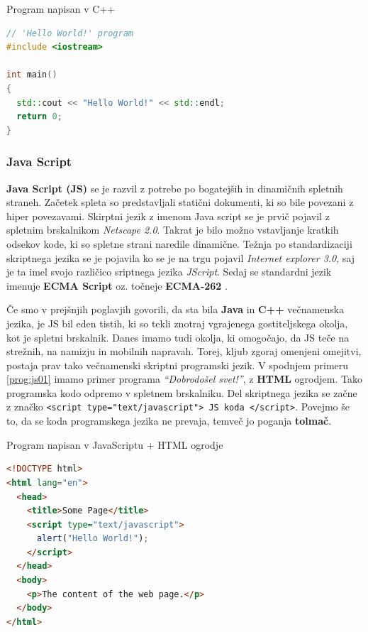 \begin{examplebox}[label={prog:cpp01}]{Program napisan v C++}
\begin{lstlisting}[language=C++]
// 'Hello World!' program
#include <iostream>

int main()
{
  std::cout << "Hello World!" << std::endl;
  return 0;
}
\end{lstlisting}
\end{examplebox}

\subsubsection{Java Script}
\label{sec:pj_JS}

\textbf{Java Script (JS)} se je razvil z potrebe po bogatejših in dinamičnih
spletnih straneh. Začetek spleta so predstavljali statični dokumenti,
ki so bile povezani z hiper povezavami. Skirptni jezik z imenom Java
script se je prvič pojavil z spletnim brskalnikom \emph{Netscape
  2.0}. Takrat je bilo možno vstavljanje kratkih odsekov kode, ki so
spletne strani naredile dinamične. Težnja po standardizaciji
skriptnega jezika se je pojavila ko se je na trgu pojavil
\emph{Internet explorer 3.0}, saj je ta imel svojo različico sriptnega
jezika \emph{JScript}. Sedaj se standardni jezik imenuje \textbf{ECMA
  Script} oz. točneje \textbf{ECMA-262} \cite{OO-JS}.

Če smo v prejšnjih poglavjih govorili, da sta bila \textbf{Java} in
\textbf{C++} večnamenska jezika, je JS bil eden tistih, ki so tekli
znotraj vgrajenega gostiteljskega okolja, kot je spletni
brskalnik. Danes imamo tudi okolja, ki omogočajo, da JS teče na
strežnih, na namizju in mobilnih napravah. Torej, kljub zgoraj
omenjeni omejitvi, postaja prav tako večnamenski skriptni programski
jezik. V spodnjem primeru \ref{prog:js01} imamo primer programa
\emph{``Dobrodošel svet!''}, z \textbf{HTML} ogrodjem. Tako programska
kodo odpremo v spletnem brskalniku. Del skriptnega jezika se začne z
značko \texttt{<script type="text/javascript"> JS koda
  </script>}. Povejmo še to, da se koda programskega jezika ne
prevaja, temveč jo poganja \textbf{tolmač}.


\begin{examplebox}[label={prog:js01}]{Program napisan v JavaScriptu +
    HTML ogrodje}
\begin{lstlisting}[language=Html]
<!DOCTYPE html>
<html lang="en">
  <head>
    <title>Some Page</title>
    <script type="text/javascript">
      alert("Hello World!");
    </script>
  </head>
  <body>
    <p>The content of the web page.</p>
  </body>
</html>
\end{lstlisting}
\end{examplebox}

